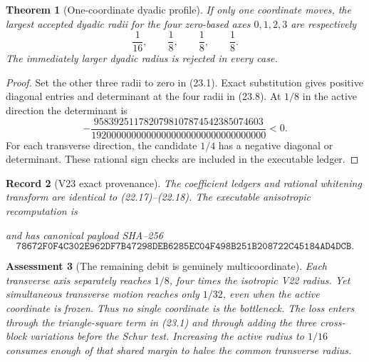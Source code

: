 \documentclass[11pt,oneside]{article}
\newtheorem{theorem}{Theorem}[section]
\newtheorem{assessment}[theorem]{Assessment}
\newtheorem{record}[theorem]{Record}
\theoremstyle{definition}
\theoremstyle{remark}
\begin{document}
\begin{theorem}[One-coordinate dyadic profile]
\label{thm:newv23-axes}
If only one coordinate moves, the largest accepted dyadic radii for
the four zero-based axes \(0,1,2,3\) are respectively
\[
 \frac1{16},\qquad\frac18,\qquad\frac18,\qquad\frac18.    \tag{23.8}
\]
The immediately larger dyadic radius is rejected in every case.
\end{theorem}

\begin{proof}
Set the other three radii to zero in (23.1).  Exact substitution
gives positive diagonal entries and determinant at the four radii
in (23.8).  At \(1/8\) in the active direction the determinant is
\[
 -\frac{
9583925117820798107874542385074603}
{19200000000000000000000000000000000}<0.                \tag{23.9}
\]
For each transverse direction, the candidate \(1/4\) has a negative
diagonal or determinant.  These rational sign checks are included
in the executable ledger.
\end{proof}

\begin{record}[V23 exact provenance]
\label{rec:newv23-provenance}
The coefficient ledgers and rational whitening transform are
identical to (22.17)--(22.18).  The executable anisotropic
recomputation is
\begin{center}
\footnotesize
{}
\end{center}
and has canonical payload SHA--256
\[
\texttt{78672F0F4C302E962DF7B47298DEB6285EC04F498B251B208722C45184AD4DCB}.
                                                               \tag{23.10}
\]
\end{record}

\begin{assessment}[The remaining debit is genuinely multicoordinate]
\label{ass:newv23}
Each transverse axis separately reaches \(1/8\), four times the
isotropic V22 radius.  Yet simultaneous transverse motion reaches
only \(1/32\), even when the active coordinate is frozen.  Thus no
single coordinate is the bottleneck.  The loss enters through the
triangle-square term in (23.1) and through adding the three
cross-block variations before the Schur test.  Increasing the
active radius to \(1/16\) consumes enough of that shared margin to
halve the common transverse radius.
\end{assessment}
\end{document}
